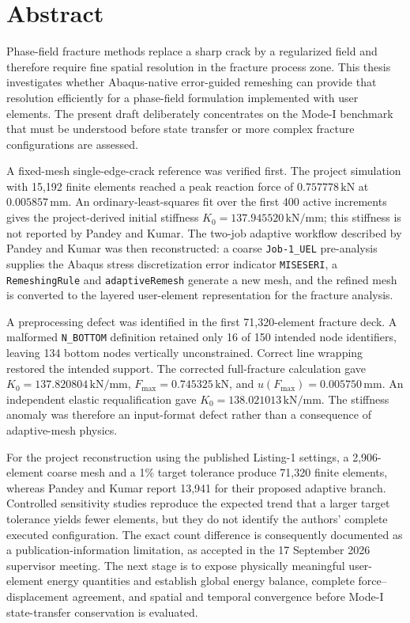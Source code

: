 \chapter*{Abstract}

Phase-field fracture methods replace a sharp crack by a regularized field and therefore require fine spatial resolution in the fracture process zone. This thesis investigates whether Abaqus-native error-guided remeshing can provide that resolution efficiently for a phase-field formulation implemented with user elements. The present draft deliberately concentrates on the Mode-I benchmark that must be understood before state transfer or more complex fracture configurations are assessed.

A fixed-mesh single-edge-crack reference was verified first. The project simulation with 15,192 finite elements reached a peak reaction force of $0.757778\,\mathrm{kN}$ at $0.005857\,\mathrm{mm}$. An ordinary-least-squares fit over the first 400 active increments gives the project-derived initial stiffness $K_0=137.945520\,\mathrm{kN/mm}$; this stiffness is not reported by Pandey and Kumar. The two-job adaptive workflow described by Pandey and Kumar was then reconstructed: a coarse \texttt{Job-1\_UEL} pre-analysis supplies the Abaqus stress discretization error indicator \texttt{MISESERI}, a \texttt{RemeshingRule} and \texttt{adaptiveRemesh} generate a new mesh, and the refined mesh is converted to the layered user-element representation for the fracture analysis.

A preprocessing defect was identified in the first 71,320-element fracture deck. A malformed \texttt{N\_BOTTOM} definition retained only 16 of 150 intended node identifiers, leaving 134 bottom nodes vertically unconstrained. Correct line wrapping restored the intended support. The corrected full-fracture calculation gave $K_0=137.820804\,\mathrm{kN/mm}$, $F_{\max}=0.745325\,\mathrm{kN}$, and $u(F_{\max})=0.005750\,\mathrm{mm}$. An independent elastic requalification gave $K_0=138.021013\,\mathrm{kN/mm}$. The stiffness anomaly was therefore an input-format defect rather than a consequence of adaptive-mesh physics.

For the project reconstruction using the published Listing-1 settings, a 2,906-element coarse mesh and a 1\% target tolerance produce 71,320 finite elements, whereas Pandey and Kumar report 13,941 for their proposed adaptive branch. Controlled sensitivity studies reproduce the expected trend that a larger target tolerance yields fewer elements, but they do not identify the authors' complete executed configuration. The exact count difference is consequently documented as a publication-information limitation, as accepted in the 17 September 2026 supervisor meeting. The next stage is to expose physically meaningful user-element energy quantities and establish global energy balance, complete force--displacement agreement, and spatial and temporal convergence before Mode-I state-transfer conservation is evaluated.
